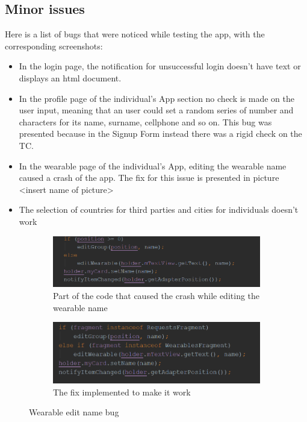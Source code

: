 \subsection{Minor issues}
Here is a list of bugs that were noticed while testing the app, with the corresponding screenshots:
\begin{itemize}
\item[] In the login page, the notification for unsuccessful login doesn't have text or displays an html document.
\item[] In the profile page of the individual's App section no check is made on the user input, meaning that an user could set a random series of number and characters for its name, surname, cellphone and so on. This bug was presented because in the Signup Form instead there was a rigid check on the TC.
\item[] In the wearable page of the individual's App, editing the wearable name caused a crash of the app. The fix for this issue is presented in picture <insert name of picture>
\item[] The selection of countries for third parties and cities for individuals doesn't work
\end{itemize}


\begin{figure}
\centering
\begin{subfigure}{.5\textwidth}
  \centering
   \includegraphics[scale=0.6]{resources/bugwearablwe.png}
   \caption{Part of the code that caused the crash while editing the wearable name}
  \label{fig:sub1}
\end{subfigure}%
\begin{subfigure}{.5\textwidth}
  \centering
   \includegraphics[scale=0.6]{resources/bugfixed.png}
   \caption{The fix implemented to make it work}
  \label{fig:sub2}
\end{subfigure}
\caption{Wearable edit name bug}
\label{fig:test}
\end{figure}

